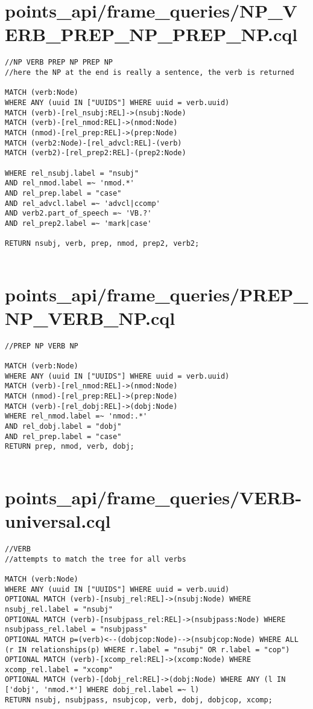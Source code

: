 \documentclass{article}
\begin{document}
\section*{points\_api/frame\_queries/NP\_VERB\_PREP\_NP\_PREP\_NP.cql}
\begin{verbatim}
//NP VERB PREP NP PREP NP
//here the NP at the end is really a sentence, the verb is returned

MATCH (verb:Node)
WHERE ANY (uuid IN ["UUIDS"] WHERE uuid = verb.uuid)
MATCH (verb)-[rel_nsubj:REL]->(nsubj:Node)
MATCH (verb)-[rel_nmod:REL]->(nmod:Node)
MATCH (nmod)-[rel_prep:REL]->(prep:Node)
MATCH (verb2:Node)-[rel_advcl:REL]-(verb)
MATCH (verb2)-[rel_prep2:REL]-(prep2:Node)

WHERE rel_nsubj.label = "nsubj"
AND rel_nmod.label =~ 'nmod.*'
AND rel_prep.label = "case"
AND rel_advcl.label =~ 'advcl|ccomp'
AND verb2.part_of_speech =~ 'VB.?'
AND rel_prep2.label =~ 'mark|case'

RETURN nsubj, verb, prep, nmod, prep2, verb2;


\end{verbatim}
\pagebreak

\section*{points\_api/frame\_queries/PREP\_NP\_VERB\_NP.cql}
\begin{verbatim}
//PREP NP VERB NP

MATCH (verb:Node)
WHERE ANY (uuid IN ["UUIDS"] WHERE uuid = verb.uuid)
MATCH (verb)-[rel_nmod:REL]->(nmod:Node)
MATCH (nmod)-[rel_prep:REL]->(prep:Node)
MATCH (verb)-[rel_dobj:REL]->(dobj:Node)
WHERE rel_nmod.label =~ 'nmod:.*'
AND rel_dobj.label = "dobj"
AND rel_prep.label = "case"
RETURN prep, nmod, verb, dobj;


\end{verbatim}
\pagebreak

\section*{points\_api/frame\_queries/VERB-universal.cql}
\begin{verbatim}
//VERB
//attempts to match the tree for all verbs

MATCH (verb:Node)
WHERE ANY (uuid IN ["UUIDS"] WHERE uuid = verb.uuid)
OPTIONAL MATCH (verb)-[nsubj_rel:REL]->(nsubj:Node) WHERE nsubj_rel.label = "nsubj"
OPTIONAL MATCH (verb)-[nsubjpass_rel:REL]->(nsubjpass:Node) WHERE nsubjpass_rel.label = "nsubjpass"
OPTIONAL MATCH p=(verb)<--(dobjcop:Node)-->(nsubjcop:Node) WHERE ALL (r IN relationships(p) WHERE r.label = "nsubj" OR r.label = "cop")
OPTIONAL MATCH (verb)-[xcomp_rel:REL]->(xcomp:Node) WHERE xcomp_rel.label = "xcomp"
OPTIONAL MATCH (verb)-[dobj_rel:REL]->(dobj:Node) WHERE ANY (l IN ['dobj', 'nmod.*'] WHERE dobj_rel.label =~ l)
RETURN nsubj, nsubjpass, nsubjcop, verb, dobj, dobjcop, xcomp;


\end{verbatim}
\pagebreak
\end{document}
